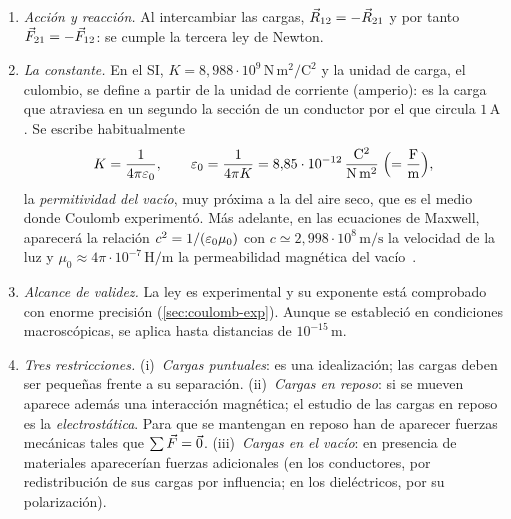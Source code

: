 

\begin{observacion}\label{obs:coulomb}
\begin{enumerate}[label=(\alph*)]
  \item \emph{Acción y reacción.} Al intercambiar las cargas, $\vec{R}_{12}=-\vec{R}_{21}$ y por tanto
        $\vec{F}_{21}=-\vec{F}_{12}$: se cumple la tercera ley de Newton.
  \item \emph{La constante.} En el SI, $K=8{,}988\cdot10^{9}\,\mathrm{N\,m^{2}/C^{2}}$ y la unidad de carga,
        el culombio, se define a partir de la unidad de corriente (amperio): es la carga que atraviesa en
        un segundo la sección de un conductor por el que circula $1\,\mathrm{A}$. Se escribe habitualmente
        \[
          K=\frac{1}{4\pi\varepsilon_{0}},\qquad
          \varepsilon_{0}=\frac{1}{4\pi K}=8{,}85\cdot10^{-12}\,\frac{\mathrm{C^{2}}}{\mathrm{N\,m^{2}}}\;\Bigl(=\frac{\mathrm{F}}{\mathrm{m}}\Bigr),
        \]
        la \emph{permitividad del vacío}, muy próxima a la del aire seco, que es el medio donde Coulomb
        experimentó. Más adelante, en las ecuaciones de Maxwell, aparecerá la relación
        $c^{2}=1/(\varepsilon_{0}\mu_0)$ con $c\simeq2{,}998\cdot10^{8}\,\mathrm{m/s}$ la velocidad de la luz y
        $\mu_0\approx4\pi\cdot10^{-7}\,\mathrm{H/m}$ la permeabilidad magnética del vacío~\cite{CODATA}.
  \item \emph{Alcance de validez.} La ley es experimental y su exponente está comprobado con enorme precisión
        (\cref{sec:coulomb-exp}). Aunque se estableció en condiciones macroscópicas, se aplica hasta distancias
        de $10^{-15}\,\mathrm{m}$.
  \item \emph{Tres restricciones.} (i)~\emph{Cargas puntuales}: es una idealización; las cargas deben ser pequeñas
        frente a su separación. (ii)~\emph{Cargas en reposo}: si se mueven aparece además una interacción
        magnética; el estudio de las cargas en reposo es la \emph{electrostática}. Para que se mantengan en
        reposo han de aparecer fuerzas mecánicas tales que $\sum\vec{F}=\vec{0}$. (iii)~\emph{Cargas en el vacío}: en
        presencia de materiales aparecerían fuerzas adicionales (en los conductores, por redistribución de
        sus cargas por influencia; en los dieléctricos, por su polarización).
\end{enumerate}
\end{observacion}

